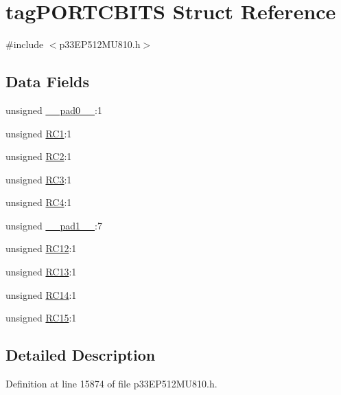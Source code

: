 \hypertarget{structtag_p_o_r_t_c_b_i_t_s}{}\section{tag\+P\+O\+R\+T\+C\+B\+I\+TS Struct Reference}
\label{structtag_p_o_r_t_c_b_i_t_s}


{\ttfamily \#include $<$p33\+E\+P512\+M\+U810.\+h$>$}

\subsection*{Data Fields}
\begin{DoxyCompactItemize}
\item 
unsigned \hyperlink{structtag_p_o_r_t_c_b_i_t_s_adf71f3d8410c1f1dbbc96680a92c49af}{\+\_\+\+\_\+pad0\+\_\+\+\_\+}\+:1
\item 
unsigned \hyperlink{structtag_p_o_r_t_c_b_i_t_s_acbac2bc4f50222ec7e8549d800993842}{R\+C1}\+:1
\item 
unsigned \hyperlink{structtag_p_o_r_t_c_b_i_t_s_a2155381890524f46a1a03878e5f52682}{R\+C2}\+:1
\item 
unsigned \hyperlink{structtag_p_o_r_t_c_b_i_t_s_ae6cab3544e1e4b7eaec41046bf007800}{R\+C3}\+:1
\item 
unsigned \hyperlink{structtag_p_o_r_t_c_b_i_t_s_aed6dec1d13dadc4721b39d5431fca93e}{R\+C4}\+:1
\item 
unsigned \hyperlink{structtag_p_o_r_t_c_b_i_t_s_acaf2d0924a107ec6e8d2e31febaf66f9}{\+\_\+\+\_\+pad1\+\_\+\+\_\+}\+:7
\item 
unsigned \hyperlink{structtag_p_o_r_t_c_b_i_t_s_a3c742c58e4ebd86ac72bcf4f45c65cd3}{R\+C12}\+:1
\item 
unsigned \hyperlink{structtag_p_o_r_t_c_b_i_t_s_a45be390edfab835095336a069d7b2463}{R\+C13}\+:1
\item 
unsigned \hyperlink{structtag_p_o_r_t_c_b_i_t_s_acf7eb6c9a44beaba1fc65f5181cc5082}{R\+C14}\+:1
\item 
unsigned \hyperlink{structtag_p_o_r_t_c_b_i_t_s_a54bd98c952e040fa0d3baccbbe5f3a2d}{R\+C15}\+:1
\end{DoxyCompactItemize}


\subsection{Detailed Description}


Definition at line 15874 of file p33\+E\+P512\+M\+U810.\+h.




